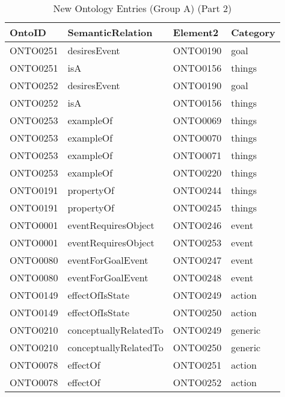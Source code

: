 \begin{table}[H]   %
\centering
\caption{New Ontology Entries (Group A) (Part 2)} \vspace{0.25em}
\begin{tabular}{|l|l|l|l|} \hline
\textbf{OntoID} & \textbf{SemanticRelation} & \textbf{Element2} & \textbf{Category} \\ \hline
ONTO0251 & desiresEvent & ONTO0190 & goal \\ \hline
ONTO0251 & isA & ONTO0156 & things \\ \hline
ONTO0252 & desiresEvent & ONTO0190 & goal \\ \hline
ONTO0252 & isA & ONTO0156 & things \\ \hline
ONTO0253 & exampleOf & ONTO0069 & things \\ \hline
ONTO0253 & exampleOf & ONTO0070 & things \\ \hline
ONTO0253 & exampleOf & ONTO0071 & things \\ \hline
ONTO0253 & exampleOf & ONTO0220 & things \\ \hline
ONTO0191 & propertyOf & ONTO0244 & things \\ \hline
ONTO0191 & propertyOf & ONTO0245 & things \\ \hline
ONTO0001 & eventRequiresObject & ONTO0246 & event \\ \hline
ONTO0001 & eventRequiresObject & ONTO0253 & event \\ \hline
ONTO0080 & eventForGoalEvent & ONTO0247 & event \\ \hline
ONTO0080 & eventForGoalEvent & ONTO0248 & event \\ \hline
ONTO0149 & effectOfIsState & ONTO0249 & action \\ \hline
ONTO0149 & effectOfIsState & ONTO0250 & action \\ \hline
ONTO0210 & conceptuallyRelatedTo & ONTO0249 & generic \\ \hline
ONTO0210 & conceptuallyRelatedTo & ONTO0250 & generic \\ \hline
ONTO0078 & effectOf & ONTO0251 & action \\ \hline
ONTO0078 & effectOf & ONTO0252 & action \\ \hline
\end{tabular}
\label{tab:grpaonto2}
\end{table}

